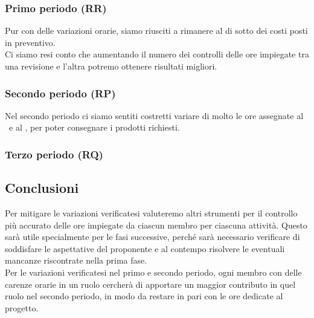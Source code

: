     	\subsubsection{Primo periodo (RR)}
   		Pur con delle variazioni orarie, siamo riusciti a rimanere al di sotto dei costi posti in preventivo.\\
   		Ci siamo resi conto che aumentando il numero dei controlli delle ore impiegate tra una revisione e l'altra potremo ottenere risultati migliori.
	
    	\subsubsection{Secondo periodo (RP)}
    	Nel secondo periodo ci siamo sentiti costretti variare di molto le ore assegnate al \Progr\ e al \Prog, per poter consegnare i prodotti richiesti.
    	
    	\subsubsection{Terzo periodo (RQ)}
    	
	\subsection{Conclusioni}
	Per mitigare le variazioni verificatesi valuteremo altri strumenti per il controllo più accurato delle ore impiegate da ciascun membro per ciascuna attività.
	Questo sarà utile specialmente per le fasi successive, perché sarà necessario verificare di soddisfare le aspettative del proponente e al contempo risolvere le eventuali mancanze riscontrate nella prima fase.\\
	Per le variazioni verificatesi nel primo e secondo periodo, ogni membro con delle carenze orarie in un ruolo cercherà di apportare un maggior contributo in quel ruolo nel secondo periodo, in modo da restare in pari con le ore dedicate al progetto.
	